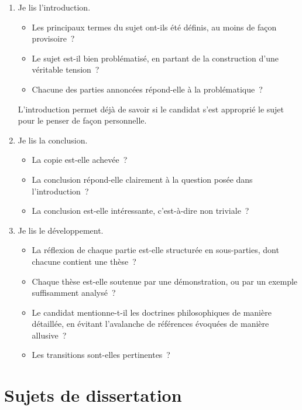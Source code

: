 \documentclass[a4paper,12pt]{article}
\begin{document}
\begin{enumerate}
\item Je lis l'introduction.

\begin{itemize}
\item Les principaux termes du sujet ont-ils été définis, au moins de
façon provisoire ?

\item Le sujet est-il bien problématisé, en partant de la construction
d'une véritable tension ?

\item Chacune des parties annoncées répond-elle à la problématique ?
\end{itemize}
L'introduction permet déjà de savoir si le candidat s'est approprié
le sujet pour le penser de façon personnelle.

\item Je lis la conclusion.

\begin{itemize}
\item La copie est-elle achevée ?

\item La conclusion répond-elle clairement à la question posée dans
l'introduction ?

\item La conclusion est-elle intéressante, c'est-à-dire non triviale ?
\end{itemize}

\item Je lis le développement.

\begin{itemize}
\item La réflexion de chaque partie est-elle structurée en sous-parties,
dont chacune contient une thèse ?

\item Chaque thèse est-elle soutenue par une démonstration, ou par un
exemple suffisamment analysé ?

\item Le candidat mentionne-t-il les doctrines philosophiques de manière
détaillée, en évitant l'avalanche de références évoquées de
manière allusive ?

\item Les transitions sont-elles pertinentes ?
\end{itemize}
\end{enumerate}

\section{Sujets de dissertation}
\label{sec-6}
\end{document}

